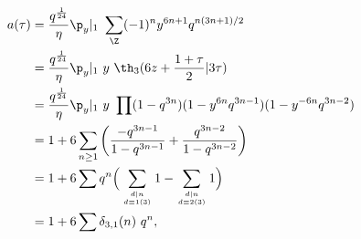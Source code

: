 \begin{equation}
  \begin{split}
    a(\tau) &= {q^{1\over 24} \over\eta} \p_y|_1 ~\sum_\Z
    (-1)^n y^{6n+1} q^{n(3n+1)/2} \\
&= {q^{1\over 24} \over\eta} \p_y|_1 ~
    y~\th_3(6z+{1+\tau\over 2}|3\tau)  \\
&= {q^{1\over 24} \over\eta} \p_y|_1 ~ y~\prod
    (1-q^{3n})(1-y^{6n}q^{3n-1})(1-y^{-6n}q^{3n-2}) \\
&= 1+ 6 \sum_{n\geq 1} \left( {-q^{3n-1} \over 1-q^{3n-1}}+
    {q^{3n-2} \over 1-q^{3n-2}} \right)\\
&= 1+6\sum q^n \Big(\sum_{d|n \atop d\equiv 1 (3)} 1 - \sum_{d|n
    \atop d\equiv 2 (3)} 1 \Big) \\
&= 1+6\sum \delta_{3,1}(n)~q^n,
  \end{split}
\end{equation}

